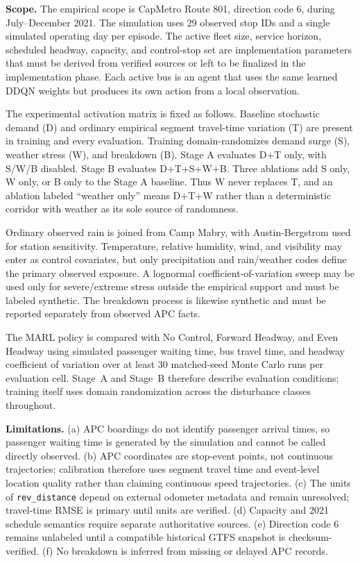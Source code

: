 \textbf{Scope.} The empirical scope is CapMetro Route 801, direction code 6, during July--December 2021. The simulation uses 29 observed stop IDs and a single simulated operating day per episode. The active fleet size, service horizon, scheduled headway, capacity, and control-stop set are implementation parameters that must be derived from verified sources or left to be finalized in the implementation phase. Each active bus is an agent that uses the same learned DDQN weights but produces its own action from a local observation.

The experimental activation matrix is fixed as follows. Baseline stochastic demand (D) and ordinary empirical segment travel-time variation (T) are present in training and every evaluation. Training domain-randomizes demand surge (S), weather stress (W), and breakdown (B). Stage A evaluates D+T only, with S/W/B disabled. Stage B evaluates D+T+S+W+B. Three ablations add S only, W only, or B only to the Stage A baseline. Thus W never replaces T, and an ablation labeled ``weather only'' means D+T+W rather than a deterministic corridor with weather as its sole source of randomness.

Ordinary observed rain is joined from Camp Mabry, with Austin-Bergstrom used for station sensitivity. Temperature, relative humidity, wind, and visibility may enter as control covariates, but only precipitation and rain/weather codes define the primary observed exposure. A lognormal coefficient-of-variation sweep may be used only for severe/extreme stress outside the empirical support and must be labeled synthetic. The breakdown process is likewise synthetic and must be reported separately from observed APC facts.

The MARL policy is compared with No Control, Forward Headway, and Even Headway using simulated passenger waiting time, bus travel time, and headway coefficient of variation over at least 30 matched-seed Monte Carlo runs per evaluation cell. Stage~A and Stage~B therefore describe evaluation conditions; training itself uses domain randomization across the disturbance classes throughout.

\textbf{Limitations.} (a) APC boardings do not identify passenger arrival times, so passenger waiting time is generated by the simulation and cannot be called directly observed. (b) APC coordinates are stop-event points, not continuous trajectories; calibration therefore uses segment travel time and event-level location quality rather than claiming continuous speed trajectories. (c) The units of \texttt{rev\_distance} depend on external odometer metadata and remain unresolved; travel-time RMSE is primary until units are verified. (d) Capacity and 2021 schedule semantics require separate authoritative sources. (e) Direction code 6 remains unlabeled until a compatible historical GTFS snapshot is checksum-verified. (f) No breakdown is inferred from missing or delayed APC records.


